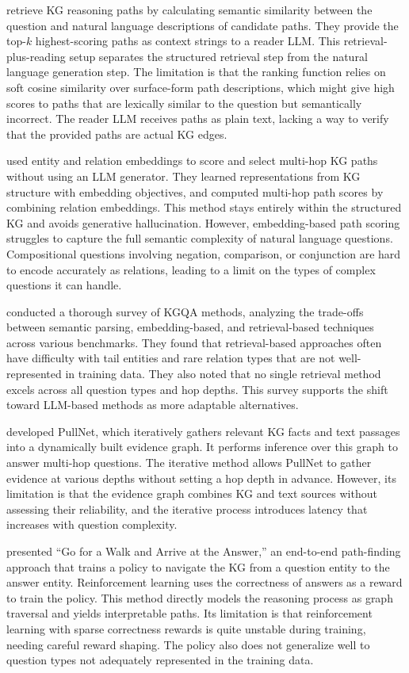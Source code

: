 \citet{shi2021kgpath} retrieve KG reasoning paths by calculating semantic similarity between the question and natural language descriptions of candidate paths. They provide the top-$k$ highest-scoring paths as context strings to a reader LLM. This retrieval-plus-reading setup separates the structured retrieval step from the natural language generation step. The limitation is that the ranking function relies on soft cosine similarity over surface-form path descriptions, which might give high scores to paths that are lexically similar to the question but semantically incorrect. The reader LLM receives paths as plain text, lacking a way to verify that the provided paths are actual KG edges.

\citet{saxena2022kgqa} used entity and relation embeddings to score and select multi-hop KG paths without using an LLM generator. They learned representations from KG structure with embedding objectives, and computed multi-hop path scores by combining relation embeddings. This method stays entirely within the structured KG and avoids generative hallucination. However, embedding-based path scoring struggles to capture the full semantic complexity of natural language questions. Compositional questions involving negation, comparison, or conjunction are hard to encode accurately as relations, leading to a limit on the types of complex questions it can handle.

\citet{lan2022kgqa} conducted a thorough survey of KGQA methods, analyzing the trade-offs between semantic parsing, embedding-based, and retrieval-based techniques across various benchmarks. They found that retrieval-based approaches often have difficulty with tail entities and rare relation types that are not well-represented in training data. They also noted that no single retrieval method excels across all question types and hop depths. This survey supports the shift toward LLM-based methods as more adaptable alternatives.

\citet{sun2019pullnet} developed PullNet, which iteratively gathers relevant KG facts and text passages into a dynamically built evidence graph. It performs inference over this graph to answer multi-hop questions. The iterative method allows PullNet to gather evidence at various depths without setting a hop depth in advance. However, its limitation is that the evidence graph combines KG and text sources without assessing their reliability, and the iterative process introduces latency that increases with question complexity.

\citet{das2017go} presented ``Go for a Walk and Arrive at the Answer,'' an end-to-end path-finding approach that trains a policy to navigate the KG from a question entity to the answer entity. Reinforcement learning uses the correctness of answers as a reward to train the policy. This method directly models the reasoning process as graph traversal and yields interpretable paths. Its limitation is that reinforcement learning with sparse correctness rewards is quite unstable during training, needing careful reward shaping. The policy also does not generalize well to question types not adequately represented in the training data.

